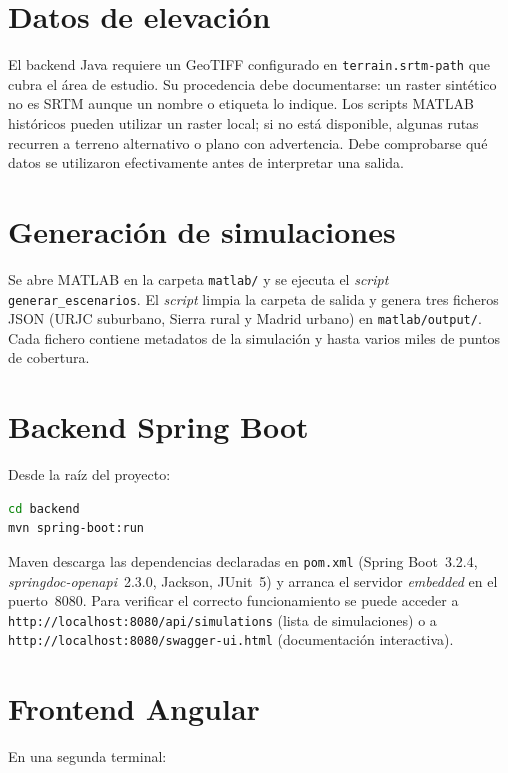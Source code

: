 \section{Datos de elevación}

El backend Java requiere un GeoTIFF configurado en \texttt{terrain.srtm-path}
que cubra el área de estudio. Su procedencia debe documentarse: un raster sintético
no es SRTM aunque un nombre o etiqueta lo indique. Los scripts MATLAB históricos
pueden utilizar un raster local; si no está disponible, algunas rutas recurren a
terreno alternativo o plano con advertencia. Debe comprobarse qué datos se utilizaron
efectivamente antes de interpretar una salida.

\section{Generación de simulaciones}

Se abre MATLAB en la carpeta \texttt{matlab/} y se ejecuta el \textit{script}
\texttt{generar\_escenarios}. El \textit{script} limpia la carpeta de salida y
genera tres ficheros JSON (URJC suburbano, Sierra rural y Madrid urbano) en
\texttt{matlab/output/}. Cada fichero contiene metadatos de la simulación y
hasta varios miles de puntos de cobertura.

\section{Backend Spring Boot}

Desde la raíz del proyecto:

\begin{lstlisting}[language=bash, caption={Arranque del backend.}]
cd backend
mvn spring-boot:run
\end{lstlisting}

Maven descarga las dependencias declaradas en \texttt{pom.xml} (Spring Boot~3.2.4,
\textit{springdoc-openapi}~2.3.0, Jackson, JUnit~5) y arranca el servidor
\textit{embedded} en el puerto~8080. Para verificar el correcto funcionamiento se
puede acceder a \texttt{http://localhost:8080/api/simulations} (lista de
simulaciones) o a \texttt{http://localhost:8080/swagger-ui.html} (documentación
interactiva).

\section{Frontend Angular}

En una segunda terminal:


